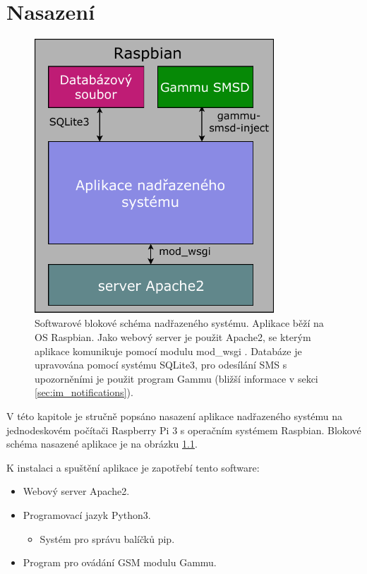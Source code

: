 \chapter{Nasazení}
\label{sec:dp}

\begin{figure}[h!]
    \centering
    \includegraphics[width=0.8\textwidth]{images/sw_block.pdf}
    \caption[Softwarové blokové schéma nadřazeného systému]{Softwarové blokové schéma nadřazeného systému. Aplikace běží na OS Raspbian. Jako webový server je použit Apache2, se kterým aplikace komunikuje pomocí modulu mod\_wsgi \cite{mod_wsgi}. Databáze je upravována pomocí systému SQLite3, pro odesílání SMS s upozorněními je použit program Gammu (bližší informace v sekci \ref{sec:im_notifications}).}
    \label{fig:sw_block}
\end{figure}

V této kapitole je stručně popsáno nasazení aplikace nadřazeného systému na jednodeskovém počítači Raspberry Pi 3 s operačním systémem Raspbian. Blokové schéma nasazené aplikace je na obrázku \ref{fig:sw_block}. 

K instalaci a spuštění aplikace je zapotřebí tento software:

\begin{itemize}
    \item Webový server Apache2.
    \item Programovací jazyk Python3.
    \begin{itemize}
        \item Systém pro správu balíčků pip. %
    \end{itemize}
    \item Program pro ovádání GSM modulu Gammu. %
\end{itemize}

